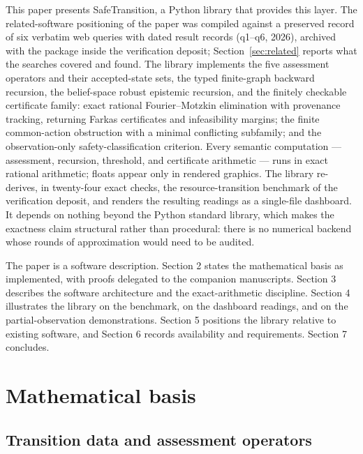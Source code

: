 \documentclass[11pt]{article}
\begin{document}
This paper presents SafeTransition, a Python library that provides this
layer. The related-software positioning of the paper was compiled against a
preserved record of six verbatim web queries with dated result records
(q1--q6, 2026), archived with the package inside the verification deposit;
Section~\ref{sec:related} reports what the searches covered and found. The library implements the five assessment operators and their
accepted-state sets, the typed finite-graph backward recursion, the
belief-space robust epistemic recursion, and the finitely checkable
certificate family: exact rational Fourier--Motzkin elimination with
provenance tracking, returning Farkas certificates and infeasibility
margins; the finite common-action obstruction with a minimal conflicting
subfamily; and the observation-only safety-classification criterion. Every semantic computation --- assessment, recursion, threshold, and certificate arithmetic --- runs in
exact rational arithmetic; floats appear only in rendered graphics. The
library re-derives, in twenty-four exact checks, the resource-transition
benchmark of the verification deposit, and renders the resulting readings as
a single-file dashboard. It depends on nothing beyond the Python standard
library, which makes the exactness claim structural rather than procedural:
there is no numerical backend whose rounds of approximation would need to be
audited.

The paper is a software description. Section 2 states the mathematical basis
as implemented, with proofs delegated to the companion manuscripts.
Section 3 describes the software architecture and the exact-arithmetic
discipline. Section 4 illustrates the library on the benchmark, on the
dashboard readings, and on the partial-observation demonstrations. Section 5
positions the library relative to existing software, and Section 6 records
availability and requirements. Section 7 concludes.

\section{Mathematical basis}\label{sec:math}

\subsection{Transition data and assessment operators}\label{sec:operators}
\end{document}
